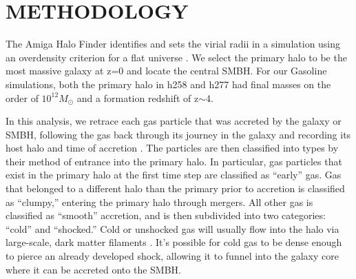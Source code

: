 \documentclass[12pt,headA,chapB]{fiskthesis}
\begin{document}




\chapter{\normalsize METHODOLOGY}
\thispagestyle{empty}

The Amiga Halo Finder identifies and sets the virial radii in a simulation using an overdensity criterion for a flat universe \citep{Knebe2001,Knollmann2009,Gill2004}. We select the primary halo to be the most massive galaxy at z=0 and locate the central SMBH. For our Gasoline simulations, both the primary halo in h258 and h277 had final masses on the order of $10^{12} M_{\odot}$ and a formation redshift of z$\sim$4.  


In this analysis, we retrace each gas particle that was accreted by the galaxy or SMBH, following the gas back through its journey in the galaxy and recording its host halo and time of accretion \citep{Brooks2009}. The particles are then classified into types by their method of entrance into the primary halo. In particular, gas particles that exist in the primary halo at the first time step are classified as ``early'' gas. Gas that belonged to a different halo than the primary prior to accretion is classified as ``clumpy,'' entering the primary halo through mergers. All other gas is classified as ``smooth'' accretion, and is then subdivided into two categories: ``cold'' and ``shocked.'' Cold or unshocked gas will usually flow into the halo via large-scale, dark matter filaments \citep{Bellovary2013}. It's possible for cold gas to be dense enough to pierce an already developed shock, allowing it to funnel into the galaxy core where it can be accreted onto the SMBH.
\end{document}
